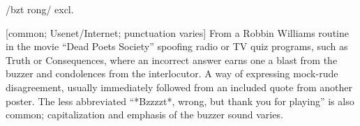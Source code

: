 /bzt rong/ excl.

[common; Usenet/Internet; punctuation varies] From a Robbin Williams routine in
the movie ``Dead Poets Society'' spoofing radio or TV quiz programs, such as
Truth or Consequences, where an incorrect answer earns one a blast from the
buzzer and condolences from the interlocutor. A way of expressing mock-rude
disagreement, usually immediately followed from an included quote from another
poster. The less abbreviated ``*Bzzzzt*, wrong, but thank you for playing'' is
also common; capitalization and emphasis of the buzzer sound varies.

